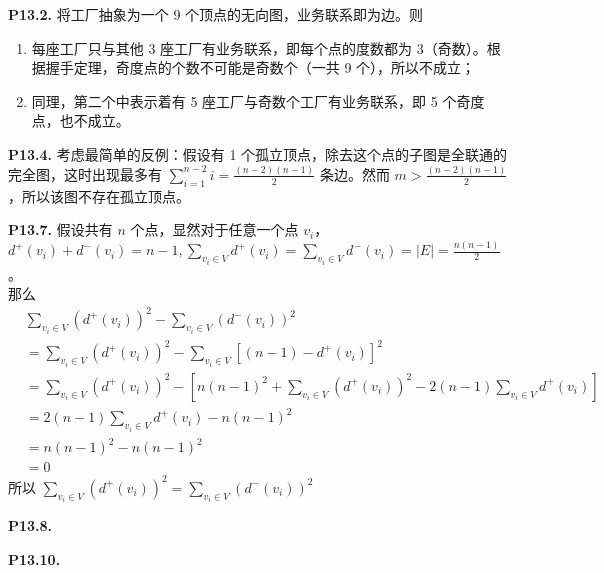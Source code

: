 \documentclass{article}
\begin{document}
\noindent \textbf{P13.2.} 将工厂抽象为一个 9 个顶点的无向图，业务联系即为边。则
\begin{enumerate}
    \item 每座工厂只与其他 3 座工厂有业务联系，即每个点的度数都为 3（奇数）。根据握手定理，奇度点的个数不可能是奇数个（一共 9 个），所以不成立；
    \item 同理，第二个中表示着有 5 座工厂与奇数个工厂有业务联系，即 5 个奇度点，也不成立。
\end{enumerate}

\noindent \textbf{P13.4.} 考虑最简单的反例：假设有 1 个孤立顶点，除去这个点的子图是全联通的完全图，这时出现最多有 $\sum_{i=1}^{n-2}i=\frac{(n-2)(n-1)}{2}$ 条边。然而 $m > \frac{(n-2)(n-1)}{2}$，所以该图不存在孤立顶点。

\noindent \textbf{P13.7.} 假设共有 $n$ 个点，显然对于任意一个点 $v_i$，$d^+(v_i)+d^-(v_i)=n-1,\sum_{v_i \in V}d^+(v_i)=\sum_{v_i \in V}d^-(v_i)=|E|=\frac{n(n-1)}{2}$。\\
那么
\begin{align*}
&\sum_{v_i \in V}(d^+(v_i))^2-\sum_{v_i \in V}(d^-(v_i))^2 \\
&=\sum_{v_i \in V}(d^+(v_i))^2-\sum_{v_i \in V}[(n-1)-d^+(v_i)]^2 \\
&=\sum_{v_i \in V}(d^+(v_i))^2-[n(n-1)^2+\sum_{v_i \in V}(d^+(v_i))^2-2(n-1)\sum_{v_i \in V}d^+(v_i)] \\
&=2(n-1)\sum_{v_i \in V}d^+(v_i)-n(n-1)^2\\
&=n(n-1)^2-n(n-1)^2\\
&=0
\end{align*}
所以 $\sum_{v_i \in V}(d^+(v_i))^2=\sum_{v_i \in V}(d^-(v_i))^2$

\noindent \textbf{P13.8.} 

\noindent \textbf{P13.10.}
\end{document}
